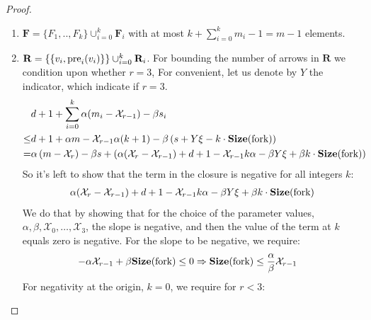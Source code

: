 \begin{proof}
\begin{enumerate}
\begin{enumerate}
          \item $\mathbf{F} = \{ F_{1},..,F_{k} \} \cup_{i = 0}^{k}\mathbf{F}_{i}$ with at most $ k + \sum_{i=0}^{k}{m_{i} -1 } = m- 1$ elements. 
          \item $\mathbf{R} = \{ \{v_{i}, \text{pre}_{i}(v_{i}) \} \} \cup_{i=0}^{k}{ \mathbf{R}_{i} }$. For bounding the number of arrows in $\mathbf{R}$ we condition upon whether $r = 3$, For convenient, let us denote by $Y$ the indicator, which indicate if $r = 3$.   
            \begin{equation*}
              \begin{split}
                & d+1 + \sum^{k}_{i=0}{\alpha (m_{i}-\mathcal{X}_{r-1})  - \beta s_{i} } \\ 
                \le & d+1 + \alpha m - \mathcal{X}_{r-1}\alpha(k+1) - \beta\left(s + Y\xi - k \cdot \mathbf{Size}(\text{fork})  \right) \\
                = & \alpha \left(m - \mathcal{X}_{r}\right) - \beta s + \left(\alpha ( \mathcal{X}_{r} - \mathcal{X}_{r-1} ) + d+1 -  \mathcal{X}_{r-1} k \alpha - \beta Y \xi + \beta k \cdot \mathbf{Size}(\text{fork}) \right)
              \end{split}
            \end{equation*}
So it's left to show that the term in the closure is negative for all integers $k$:
            \begin{equation*}
              \begin{split}
\alpha ( \mathcal{X}_{r} - \mathcal{X}_{r-1} ) + d+1 -  \mathcal{X}_{r-1} k \alpha - \beta Y \xi + \beta k \cdot \mathbf{Size}(\text{fork}) 
              \end{split}
            \end{equation*}
            We do that by showing that for the choice of the parameter values, $\alpha, \beta, \mathcal{X}_{0}, \ldots, \mathcal{X}_{3}$, the slope is negative, and then the value of the term at $k$ equals zero is negative.  For the slope to be negative, we require: 
            \begin{equation*}
              \begin{split}
                - \alpha \mathcal{X}_{r-1}  +  \beta \mathbf{Size}(\text{fork}) \le 0 & \Rightarrow   \mathbf{Size}(\text{fork}) \le \frac{\alpha}{\beta} \mathcal{X}_{r-1} 
              \end{split}
            \end{equation*}
            For negativity at the origin, $k=0$, we require for $r < 3$:
            \begin{equation*}

\end{equation*}
\end{enumerate}
\end{enumerate}
\end{proof}
